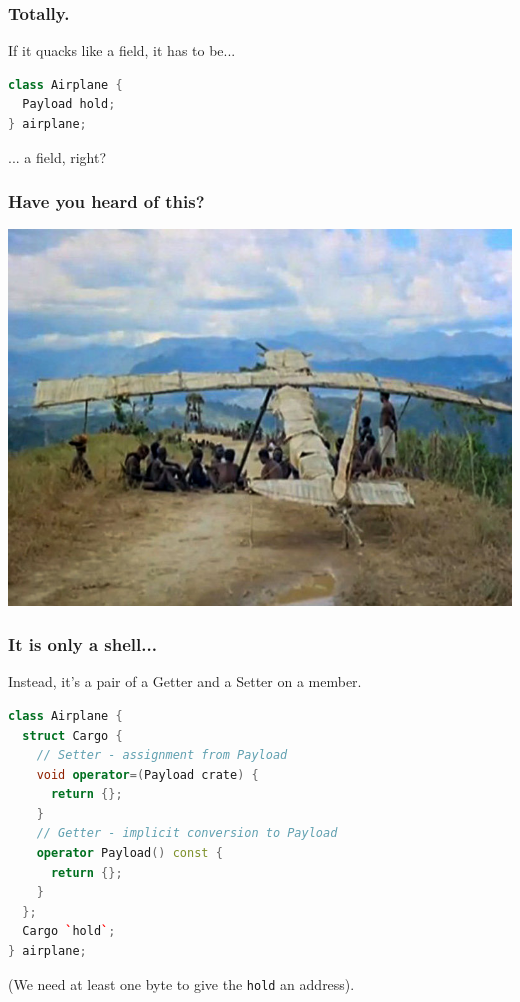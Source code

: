 \documentclass{beamer}
\def\code#1{\texttt{#1}}
\begin{document}
\begin{frame}[fragile]
\frametitle{Totally.}

\begin{center}
If it quacks like a field, it has to be...
\end{center}

\begin{lstlisting}[language=cpp]
class Airplane {
  Payload hold;
} airplane;
\end{lstlisting}

\begin{center}
... a field, right?
\end{center}
\end{frame}


\begin{frame}[fragile]
\frametitle{Have you heard of this?}

\includegraphics[width=\textwidth]{CargoCultAirplane.jpg}
\end{frame}


\begin{frame}[fragile]
\frametitle{It is only a shell...}

\begin{center}
Instead, it's a pair of a Getter and a Setter on a member.
\end{center}
\begin{lstlisting}[language=cpp]
class Airplane {
  struct Cargo {
    // Setter - assignment from Payload
    void operator=(Payload crate) {
      return {};
    }
    // Getter - implicit conversion to Payload
    operator Payload() const {
      return {};
    }
  };
  Cargo `hold`;
} airplane;
\end{lstlisting}
\begin{center}
{\small(We need at least one byte to give the \code{hold} an address)}.
\end{center}
\end{frame}
\end{document}
